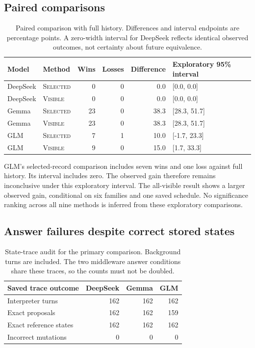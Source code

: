 \documentclass[11pt,a4paper]{article}
\newcommand{\sel}{\textsc{Selected}}
\newcommand{\vis}{\textsc{Visible}}
\begin{document}
\subsection{Paired comparisons}
\begin{table}[ht]
\centering\small
\begin{tabular}{llrrrl}
\toprule
Model & Method & Wins & Losses & Difference & Exploratory 95\% interval \\
\midrule
DeepSeek & \sel{} & 0 & 0 & 0.0 & [0.0, 0.0] \\
DeepSeek & \vis{} & 0 & 0 & 0.0 & [0.0, 0.0] \\
Gemma & \sel{} & 23 & 0 & 38.3 & [28.3, 51.7] \\
Gemma & \vis{} & 23 & 0 & 38.3 & [28.3, 51.7] \\
GLM & \sel{} & 7 & 1 & 10.0 & [-1.7, 23.3] \\
GLM & \vis{} & 9 & 0 & 15.0 & [1.7, 33.3] \\
\bottomrule
\end{tabular}
\caption{Paired comparison with full history. Differences and interval endpoints are percentage points. A zero-width interval for DeepSeek reflects identical observed outcomes, not certainty about future equivalence.}
\label{tab:paired}
\end{table}

GLM's selected-record comparison includes seven wins and one loss against full history. Its interval includes zero. The observed gain therefore remains inconclusive under this exploratory interval. The all-visible result shows a larger observed gain, conditional on six families and one saved schedule. No significance ranking across all nine methods is inferred from these exploratory comparisons.

\subsection{Answer failures despite correct stored states}
\begin{table}[ht]
\centering
\begin{tabular}{lrrr}
\toprule
Saved trace outcome & DeepSeek & Gemma & GLM \\
\midrule
Interpreter turns & 162 & 162 & 162 \\
Exact proposals & 162 & 162 & 159 \\
Exact reference states & 162 & 162 & 162 \\
Incorrect mutations & 0 & 0 & 0 \\
\bottomrule
\end{tabular}
\caption{State-trace audit for the primary comparison. Background turns are included. The two middleware answer conditions share these traces, so the counts must not be doubled.}
\label{tab:states}
\end{table}
\end{document}
